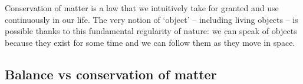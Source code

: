 \documentclass[a4paper,12pt,%
onecolumn,oneside,%
british%
]{memoir}
\newcommand*{\defd}{\coloneqq}
\renewcommand*{\|}[1][]{\nonscript\:#1\vert\nonscript\:\mathopen{}}
\newcommand*{\yN}{N}
\newcommand*{\yJ}{J}
\begin{document}
Conservation of matter is a law that we intuitively take for granted and use continuously in our life. The very notion of \enquote*{object} -- including living objects -- is possible thanks to this fundamental regularity of nature: we can speak of objects because they exist for some time and we can follow them as they move in space. %


\subsection{Balance vs conservation of matter}
\label{sec:matter_balances}
\end{document}
